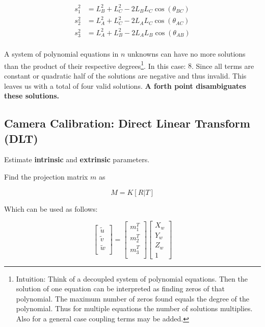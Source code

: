 \documentclass[10pt,a4paper]{scrartcl}
\begin{document}
\begin{multicols*}{2}
\begin{enumerate}
\begin{align*}
s_1^2&=L_B^2+L_C^2-2L_BL_C\cos(\theta_{BC})\\
s_2^2&=L_A^2+L_C^2-2L_AL_C\cos(\theta_{AC})\\
s_3^2&=L_A^2+L_B^2-2L_AL_B\cos(\theta_{AB})\\
\end{align*}

A system of polynomial equations in $n$ unknowns can have no more solutions than the product of their respective degrees\footnote{Intuition: Think of a decoupled system of polynomial equations. Then the solution of one equation can be interpreted as finding zeros of that polynomial. The maximum number of zeros found equals the degree of the polynomial. Thus for multiple equations the number of solutions multiplies. Also for a general case coupling terms may be added.}. In this case: $8$. Since all terms are constant or quadratic half of the solutions are negative and thus invalid. This leaves us with a total of four valid solutions. \textbf{A forth point disambiguates these solutions.}

\end{enumerate}

\subsection{Camera Calibration: Direct Linear Transform (DLT)} \label{sec:DLT}

Estimate \textbf{intrinsic} and \textbf{extrinsic} parameters.

Find the projection matrix $m$ as

\begin{equation*}
M = K[R|T]
\end{equation*}

Which can be used as follows:

\begin{equation*}
\begin{bmatrix}
\tilde{u}\\
\tilde{v}\\
\tilde{w}\\
\end{bmatrix}=
\begin{bmatrix}
m_1^T\\
m_2^T\\
m_3^T\\
\end{bmatrix}
\begin{bmatrix}
X_w\\
Y_w\\
Z_w\\
1
\end{bmatrix}
\end{equation*}


\end{multicols*}
\end{document}
